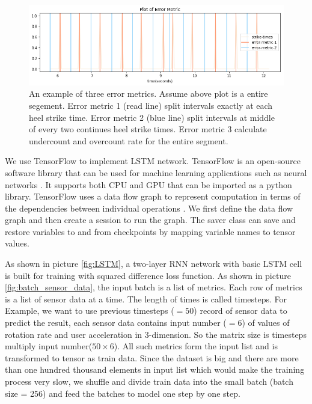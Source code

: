 \documentclass[11pt]{article}
\begin{document}
{\begin{figure}[ht]
\centering
\includegraphics[scale=0.6]{error_metric}
\caption{An example of three error metrics. Assume above plot is a entire segement. Error metric 1 (read line) split intervals exactly at each heel strike time. Error metric 2 (blue line) split intervals at middle of every two continues heel strike times. Error metric 3 calculate undercount and overcount rate for the entire segment.}
\label{fig:error_metric}
\end{figure}

We use TensorFlow to implement LSTM network. TensorFlow is an open-source software library that can be used for machine learning applications such as neural networks \cite{wiki:tensorflow}. It supports both CPU and GPU that can be imported as a python library. TensorFlow uses a data flow graph to represent computation in terms of the dependencies between individual operations \cite{tensorflow.org}. We first define the data flow graph and then create a session to run the graph. The saver class can save and restore variables to and from checkpoints by mapping variable names to tensor values.

As shown in picture \ref{fig:LSTM}, a two-layer RNN network with basic LSTM cell is built for training with squared difference loss function. 
As shown in picture \ref{fig:batch_sensor_data}, the input batch is a list of metrics. Each row of metrics is a list of sensor data at a time. The length of times is called timesteps.
For Example, we want to use previous timesteps ($=50$) record of sensor data to predict the result, each sensor data contains input number ($=6$) of values of rotation rate and user acceleration in 3-dimension. So the matrix size is timesteps multiply input number($50 \times 6$). All such metrics form the input list and is transformed to tensor as train data. Since the dataset is big and there are more than one hundred thousand elements in input list which would make the training process very slow, we shuffle and divide train data into the small batch (batch size = 256) and feed the batches to model one step by one step.

}
\end{document}
